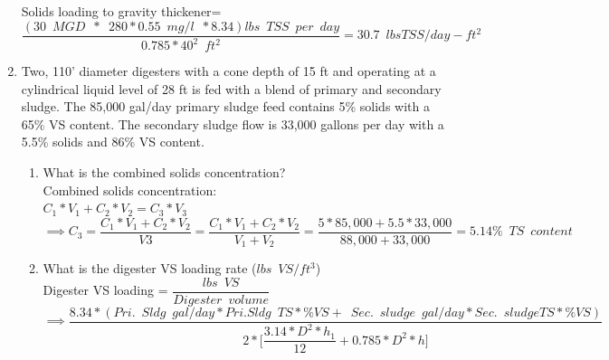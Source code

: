 \documentclass{article}
\begin{document}
\begin{enumerate}
Solids loading to gravity thickener=$\dfrac{(30 \enspace MGD \enspace * \enspace 280*0.55 \enspace mg/l \enspace *8.34) lbs \enspace TSS \enspace per  \enspace day}{0.785*40^2 \enspace ft^2}=\boxed{30.7 \enspace lbs TSS/day-ft^2}$
\pagebreak
\item Two, 110' diameter digesters with a cone depth of 15 ft and operating at a cylindrical liquid level of 28 ft is fed with a blend of primary and secondary sludge.  The 85,000 gal/day primary sludge feed contains 5\% solids with a 65\% VS content.  The secondary sludge flow is 33,000 gallons per day with a 5.5\% solids and 86\% VS content.  

\begin{enumerate}
\item What is the combined solids concentration?\\
Combined solids concentration:\\
$
C_1*V_1 + C_2*V_2 = C_3*V_3$\\
$\implies C_3 = \dfrac{C_1*V_1 + C_2*V_2}{V3}=\dfrac{C_1*V_1 + C_2*V_2}{V_1 + V_2}=\dfrac{5*85,000 + 5.5*33,000}{88,000 + 33,000}=\boxed{5.14\% \enspace TS \enspace content}
$\\

\item What is the digester VS loading rate ($lbs \enspace VS / ft^3$)\\
Digester VS loading = $\dfrac{lbs \enspace VS}{Digester \enspace volume}$\\
\vspace{0.3cm}
$\implies \dfrac{8.34*(Pri. \enspace Sldg \enspace gal/day *Pri. Sldg \enspace TS *\%VS + \enspace Sec. \enspace sludge \enspace gal/day *Sec. \enspace sludge TS *\%VS)}{2*\Big[\dfrac{3.14*D^2*h_1}{12}+0.785*D^2*h\Big]}$
 \vspace{0.4cm}
 
 
 

\end{enumerate}
\end{enumerate}
\end{document}
